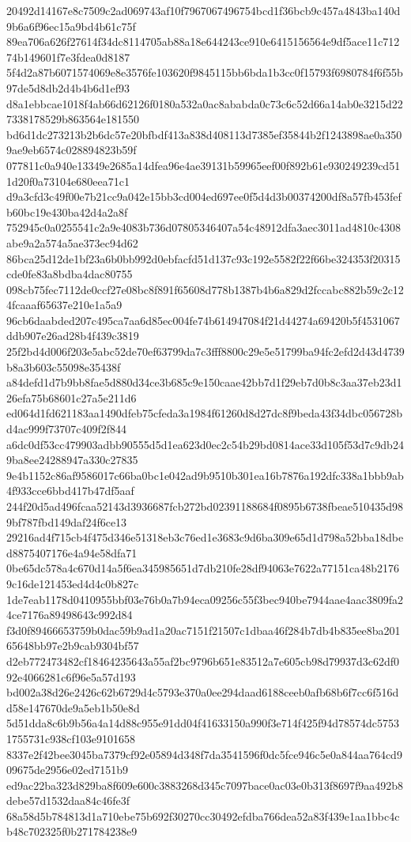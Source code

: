 {20492d14167e8c7509c2ad069743af10f7967067496754bcd1f36bcb9c457a4843ba140d9b6a6f96ec15a9bd4b61c75f
89ea706a626f27614f34dc8114705ab88a18e644243ce910e6415156564e9df5ace11c71274b149601f7e3fdea0d8187
5f4d2a87b6071574069e8e3576fe103620f9845115bb6bda1b3cc0f15793f6980784f6f55b97de5d8db2d4b4b6d1ef93
d8a1ebbcae1018f4ab66d62126f0180a532a0ac8ababda0c73c6c52d66a14ab0e3215d227338178529b863564e181550
bd6d1dc273213b2b6dc57e20bfbdf413a838d408113d7385ef35844b2f1243898ae0a3509ae9eb6574c028894823b59f
077811c0a940e13349e2685a14dfea96e4ae39131b59965eef00f892b61e930249239cd511d20f0a73104e680eea71c1
d9a3cfd3c49f00e7b21cc9a042e15bb3cd004ed697ee0f5d4d3b00374200df8a57fb453fefb60bc19e430ba42d4a2a8f
752945c0a0255541c2a9e4083b736d07805346407a54c48912dfa3aec3011ad4810c4308abe9a2a574a5ae373ec94d62
86bca25d12de1bf23a6b0bb992d0ebfacfd51d137c93c192e5582f22f66be324353f20315cde0fe83a8bdba4dac80755
098cb75fec7112de0ccf27e08bc8f891f65608d778b1387b4b6a829d2fccabc882b59c2c124fcaaaf65637e210e1a5a9
96cb6daabded207c495ca7aa6d85ec004fe74b614947084f21d44274a69420b5f4531067ddb907e26ad28b4f439c3819
25f2bd4d006f203e5abc52de70ef63799da7c3fff8800c29e5e51799ba94fc2efd2d43d4739b8a3b603c55098e35438f
a84defd1d7b9bb8fae5d880d34ce3b685c9e150caae42bb7d1f29eb7d0b8c3aa37eb23d126efa75b68601c27a5e211d6
ed064d1fd621183aa1490dfeb75cfeda3a1984f61260d8d27dc8f9beda43f34dbc056728bd4ac999f73707c409f2f844
a6dc0df53cc479903adbb90555d5d1ea623d0ec2c54b29bd0814ace33d105f53d7c9db249ba8ee24288947a330c27835
9e4b1152c86af9586017c66ba0bc1e042ad9b9510b301ea16b7876a192dfc338a1bbb9ab4f933cce6bbd417b47df5aaf
244f20d5ad496fcaa52143d3936687fcb272bd02391188684f0895b6738fbeae510435d989bf787fbd149daf24f6ce13
29216ad4f715cb4f475d346e51318eb3c76ed1e3683c9d6ba309e65d1d798a52bba18dbed8875407176e4a94e58dfa71
0be65dc578a4c670d14a5f6ea345985651d7db210fe28df94063e7622a77151ca48b21769c16de121453ed4d4c0b827c
1de7eab1178d0410955bbf03e76b0a7b94eca09256c55f3bec940be7944aae4aac3809fa24ce7176a89498643c992d84
f3d0f89466653759b0dac59b9ad1a20ac7151f21507c1dbaa46f284b7db4b835ee8ba20165648bb97e2b9cab9304bf57
d2eb772473482cf18464235643a55af2bc9796b651e83512a7e605cb98d79937d3c62df092e4066281c6f96e5a57d193
bd002a38d26e2426c62b6729d4c5793e370a0ee294daad6188ceeb0afb68b6f7cc6f516dd58e147670de9a5eb1b50e8d
5d51dda8c6b9b56a4a14d88c955e91dd04f41633150a990f3e714f425f94d78574dc57531755731c938cf103e9101658
8337e2f42bee3045ba7379cf92e05894d348f7da3541596f0dc5fce946c5e0a844aa764cd909675de2956e02ed7151b9
ed9ac22ba323d829ba8f609e600c3883268d345c7097bace0ac03e0b313f8697f9aa492b8debe57d1532daa84c46fe3f
68a58d5b784813d1a710ebe75b692f30270cc30492efdba766dea52a83f439e1aa1bbc4cb48c702325f0b271784238e9
}
